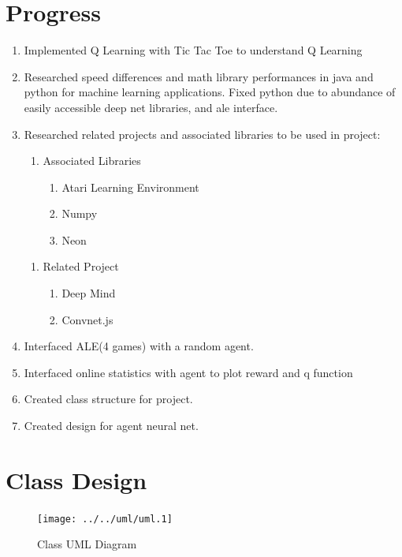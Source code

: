 \documentclass[twoside,letterpaper]{article}
\begin{document}
\section{Progress}
    \begin{enumerate}
      \item Implemented Q Learning with Tic Tac Toe to understand Q Learning
      \item Researched speed differences and math library performances in java and python for machine learning applications. Fixed python due to abundance of easily accessible deep net libraries, and ale interface.
      \item Researched related projects and associated libraries to be used in project:
      \begin{enumerate}
        \item Associated Libraries
        \begin{enumerate}
          \item Atari Learning Environment
          \item Numpy
          \item Neon
        \end{enumerate}
      \end{enumerate}
      
      \begin{enumerate}
        \item Related Project
        \begin{enumerate}
          \item Deep Mind
          \item Convnet.js
        \end{enumerate}
      \end{enumerate}
    \item Interfaced ALE(4 games) with a random agent.
    \item Interfaced online statistics with agent to plot reward and q function
    \item Created class structure for project.
    \item Created design for agent neural net.
    \end{enumerate}

\newpage
\section{Class Design}
\begin{figure}[ht]
  \centering
  \texttt{[image: ../../uml/uml.1]}
  \caption{Class UML Diagram}
\end{figure}
\end{document}
